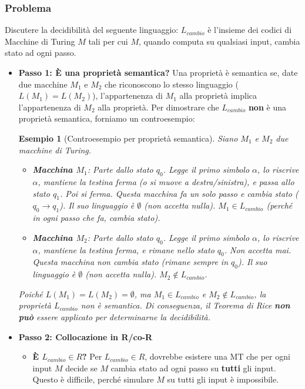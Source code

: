 \documentclass[a4paper, 11pt]{book} %
\newtheorem{example}[theorem]{Esempio}
\theoremstyle{definition}
\begin{document}
\subsubsection{Problema}
Discutere la decidibilità del seguente linguaggio: $L_{cambio}$ è l'insieme dei codici di Macchine di Turing $M$ tali per cui $M$, quando computa su qualsiasi input, cambia stato ad ogni passo.
\begin{itemize}
    \item \textbf{Passo 1: È una proprietà semantica?}
    Una proprietà è semantica se, date due macchine $M_1$ e $M_2$ che riconoscono lo stesso linguaggio ($L(M_1) = L(M_2)$), l'appartenenza di $M_1$ alla proprietà implica l'appartenenza di $M_2$ alla proprietà.
    Per dimostrare che $L_{cambio}$ \textbf{non} è una proprietà semantica, forniamo un controesempio:
    \begin{example}[Controesempio per proprietà semantica]
        Siano $M_1$ e $M_2$ due macchine di Turing.
        \begin{itemize}
            \item \textbf{Macchina $M_1$}:
            Parte dallo stato $q_0$. Legge il primo simbolo $\alpha$, lo riscrive $\alpha$, mantiene la testina ferma (o si muove a destra/sinistra), e passa allo stato $q_1$. Poi si ferma.
            Questa macchina fa un solo passo e cambia stato ($q_0 \to q_1$). Il suo linguaggio è $\emptyset$ (non accetta nulla). $M_1 \in L_{cambio}$ (perché in ogni passo che fa, cambia stato).
            \item \textbf{Macchina $M_2$}:
            Parte dallo stato $q_0$. Legge il primo simbolo $\alpha$, lo riscrive $\alpha$, mantiene la testina ferma, e rimane nello stato $q_0$. Non accetta mai.
            Questa macchina non cambia stato (rimane sempre in $q_0$). Il suo linguaggio è $\emptyset$ (non accetta nulla). $M_2 \notin L_{cambio}$.
        \end{itemize}
        Poiché $L(M_1) = L(M_2) = \emptyset$, ma $M_1 \in L_{cambio}$ e $M_2 \notin L_{cambio}$, la proprietà $L_{cambio}$ non è semantica. Di conseguenza, il Teorema di Rice \textbf{non può} essere applicato per determinarne la decidibilità.
    \end{example}

    \item \textbf{Passo 2: Collocazione in R/co-R}
    \begin{itemize}
        \item \textbf{È $L_{cambio} \in R$?}
        Per $L_{cambio} \in R$, dovrebbe esistere una MT che per ogni input $M$ decide se $M$ cambia stato ad ogni passo su \textbf{tutti} gli input. Questo è difficile, perché simulare $M$ su tutti gli input è impossibile.


\end{itemize}
\end{itemize}
\end{document}

